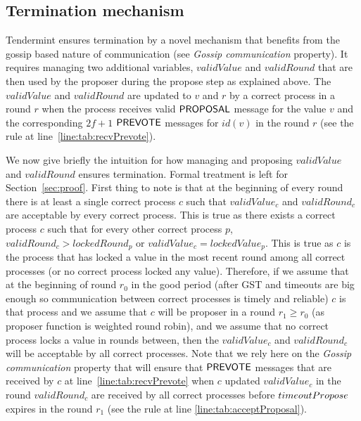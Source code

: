 \subsection{Termination mechanism}

Tendermint ensures termination by a novel mechanism that benefits from the gossip based nature of communication (see \emph{Gossip communication} property).  
 It requires managing two additional variables, $validValue$ and $validRound$ that are then used by the proposer during the propose step as explained above.   
The $validValue$ and $validRound$ are updated to $v$ and $r$ by a correct process in a round $r$ when the process receives valid $\mathsf{PROPOSAL}$ message for the value $v$ and the corresponding $2f+1$ $\mathsf{PREVOTE}$ messages for $id(v)$ in the round $r$ (see the rule at line~\ref{line:tab:recvPrevote}).

We now give briefly the intuition for how managing and proposing $validValue$ and $validRound$ ensures termination. Formal treatment is left for Section~\ref{sec:proof}.  First thing to note is that at the beginning of every round there is at least a single correct process $c$ such that $validValue_c$ and $validRound_c$ are acceptable by every correct process. This is true as there exists a correct process $c$ such that for every other correct process $p$, $validRound_c > lockedRound_p$ or $validValue_c = lockedValue_p$. This is true as $c$ is the process that has locked a value in the most recent round among all correct processes (or no correct process locked any value). Therefore, if we assume that at the beginning of round $r_0$ in the good period (after GST and timeouts are big enough so communication between correct processes is timely and reliable) $c$ is that process and we assume that $c$ will be proposer in a round $r_1 \ge r_0$ (as proposer function is weighted round robin), and we assume that no correct process locks a value in rounds between, then the $validValue_c$ and $validRound_c$ will be acceptable by all correct processes. Note that we rely here on the \emph{Gossip communication} property that will ensure that $\mathsf{PREVOTE}$ messages that are received by $c$ at line~\ref{line:tab:recvPrevote} when $c$ updated $validValue_c$ in the round $validRound_c$ are received by all correct processes before $timeoutPropose$ expires in the round $r_1$ (see the rule at line \ref{line:tab:acceptProposal}).   

